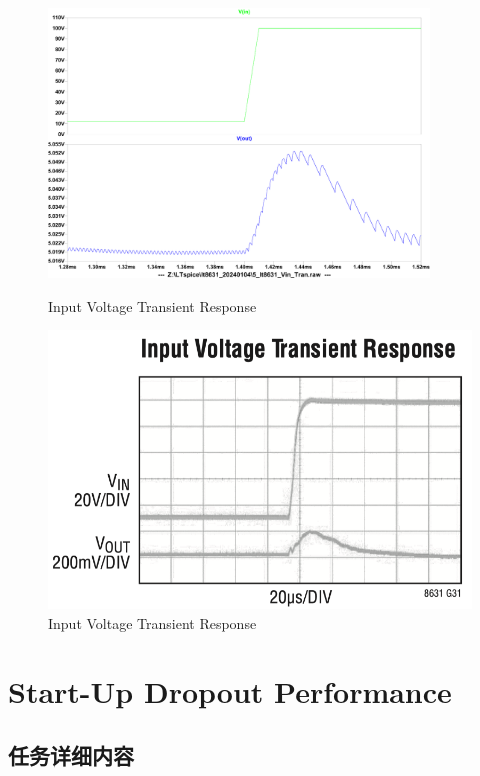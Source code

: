 \documentclass[lang=cn,10pt]{elegantbook}
\begin{document}
\begin{figure}[htbp]
    \centering\begin{minipage}[t]{0.48\textwidth}
        \centering\includegraphics[page=1, width=0.9\textwidth]{figure/5_lt8631_Vin_Tran_2.pdf}
        \caption{Input Voltage Transient Response}
    \end{minipage}
    \centering\begin{minipage}[t]{0.48\textwidth}
        \centering\includegraphics[width=0.9\linewidth]{figure/datasheet_G31.png}
        \caption{Input Voltage Transient Response}
    \end{minipage}
\end{figure}

\section{Start-Up Dropout Performance}

\subsection{任务详细内容}
\end{document}
